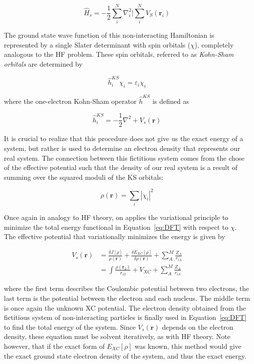 \begin{equation}
  \hat{H}_s = -\frac{1}{2}\sum_i^N\nabla_i^2 | \sum_i^N V_S(\mathbf{r}_i)
\end{equation}

\noindent The ground state wave function of this non-interacting Hamiltonian is
represented by a single Slater determinant with spin orbitals ($\chi$),
completely analogous to the HF problem. These spin orbitals, referred to as
\emph{Kohn-Sham orbitals} are determined by

\begin{equation}
  \hat{h}_i^{KS} \chi_i = \varepsilon_i \chi_i
  \label{eq:kohnsham}
\end{equation}

\noindent where the one-electron Kohn-Sham operator $\hat{h}^{KS}$ is defined
as

\begin{equation}
  \hat{h}_i^{KS} = -\frac{1}{2}\nabla^2 + V_s(\mathbf{r})
  \label{eq:ksoperator}
\end{equation}

It is crucial to realize that this procedure does not give us the exact energy
of a system, but rather is used to determine an electron density that
represents our real system. The connection between this fictitious system comes
from the chose of the effective potential such that the density of our real
system is a result of summing over the squared moduli of the KS orbitals:

\begin{equation}
  \rho(\mathbf{r}) = \sum_i | \chi_i |^2
\end{equation}

Once again in analogy to HF theory, on applies the variational principle to
minimize the total energy functional in Equation~\ref{eq:DFT} with respect to
$\chi$. The effective potential that variationally minimizes the energy is
given by\cite{Parr1995}

\begin{equation}
\begin{split}
  V_s(\mathbf{r}) &= \frac{\delta J[\rho]}{\rho(\mathbf{r})} + \frac{\delta E_{XC}[\rho]}{\delta \rho(\mathbf{r})} + \sum_A^M \frac{Z_A}{r_{iA}} \\
  &= \int\frac{\rho(\mathbf{r}_2)}{r_{12}} + V_{XC} + \sum_A^M \frac{Z_A}{r_{iA}}
\end{split}
\end{equation}

\noindent where the first term describes the Coulombic potential between two
electrons, the last term is the potential between the electron and each
nucleus. The middle term is once again the unknown XC potential. The electron
density obtained from the fictitious system of non-interacting particles is
finally used in Equation~\ref{eq:DFT} to find the total energy of the system.
Since $V_s(\mathbf{r})$ depends on the electron density, these equation must be
solvent iteratively, as with HF theory. Note however, that if the exact form of
$E_{XC}[\rho]$ was known, this method would give the exact ground state
electron density of the system, and thus the exact energy.

